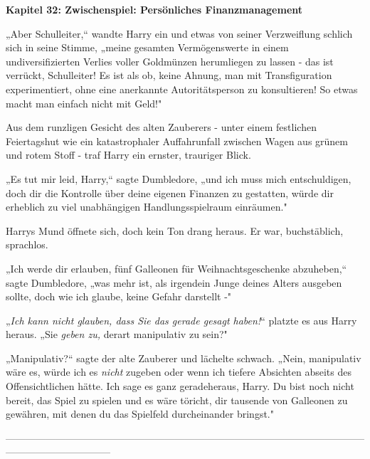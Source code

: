 

\hypertarget{zwischenspiel-persuxf6nliches-finanzmanagement}{%

\textbf{Kapitel 32: Zwischenspiel: Persönliches Finanzmanagement\\ }

\hfill\break „Aber Schulleiter,“ wandte Harry ein und etwas von seiner Verzweiflung schlich sich in seine Stimme, „meine gesamten Vermögenswerte in einem undiversifizierten Verlies voller Goldmünzen herumliegen zu lassen - das ist verrückt, Schulleiter! Es ist als ob, keine Ahnung, man mit Transfiguration experimentiert, ohne eine anerkannte Autoritätsperson zu konsultieren! So etwas macht man einfach nicht mit Geld!"

Aus dem runzligen Gesicht des alten Zauberers - unter einem festlichen Feiertagshut wie ein katastrophaler Auffahrunfall zwischen Wagen aus grünem und rotem Stoff - traf Harry ein ernster, trauriger Blick.

„Es tut mir leid, Harry,“ sagte Dumbledore, „und ich muss mich entschuldigen, doch dir die Kontrolle über deine eigenen Finanzen zu gestatten, würde dir erheblich zu viel unabhängigen Handlungsspielraum einräumen."

Harrys Mund öffnete sich, doch kein Ton drang heraus. Er war, buchstäblich, sprachlos.

„Ich werde dir erlauben, fünf Galleonen für Weihnachtsgeschenke abzuheben,“ sagte Dumbledore, „was mehr ist, als irgendein Junge deines Alters ausgeben sollte, doch wie ich glaube, keine Gefahr darstellt -"

„\emph{Ich kann nicht glauben, dass Sie das gerade gesagt haben!}“ platzte es aus Harry heraus. „Sie \emph{geben zu,} derart manipulativ zu sein?"

„Manipulativ?“ sagte der alte Zauberer und lächelte schwach. „Nein, manipulativ wäre es, würde ich es \emph{nicht} zugeben oder wenn ich tiefere Absichten abseits des Offensichtlichen hätte. Ich sage es ganz geradeheraus, Harry. Du bist noch nicht bereit, das Spiel zu spielen und es wäre töricht, dir tausende von Galleonen zu gewähren, mit denen du das Spielfeld durcheinander bringst."

--------------------------------------------------------------------------------------------------------------------------------------------

}
